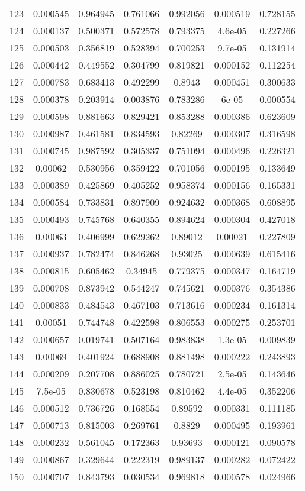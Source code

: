 \begin{table}
\begin{tabular}{c|c|c|c|c|c|c}
123 & 0.000545 & 0.964945 & 0.761066 & 0.992056 & 0.000519 & 0.728155\\
124 & 0.000137 & 0.500371 & 0.572578 & 0.793375 & 4.6e-05 & 0.227266\\
125 & 0.000503 & 0.356819 & 0.528394 & 0.700253 & 9.7e-05 & 0.131914\\
126 & 0.000442 & 0.449552 & 0.304799 & 0.819821 & 0.000152 & 0.112254\\
127 & 0.000783 & 0.683413 & 0.492299 & 0.8943 & 0.000451 & 0.300633\\
128 & 0.000378 & 0.203914 & 0.003876 & 0.783286 & 6e-05 & 0.000554\\
129 & 0.000598 & 0.881663 & 0.829421 & 0.853288 & 0.000386 & 0.623609\\
130 & 0.000987 & 0.461581 & 0.834593 & 0.82269 & 0.000307 & 0.316598\\
131 & 0.000745 & 0.987592 & 0.305337 & 0.751094 & 0.000496 & 0.226321\\
132 & 0.00062 & 0.530956 & 0.359422 & 0.701056 & 0.000195 & 0.133649\\
133 & 0.000389 & 0.425869 & 0.405252 & 0.958374 & 0.000156 & 0.165331\\
134 & 0.000584 & 0.733831 & 0.897909 & 0.924632 & 0.000368 & 0.608895\\
135 & 0.000493 & 0.745768 & 0.640355 & 0.894624 & 0.000304 & 0.427018\\
136 & 0.00063 & 0.406999 & 0.629262 & 0.89012 & 0.00021 & 0.227809\\
137 & 0.000937 & 0.782474 & 0.846268 & 0.93025 & 0.000639 & 0.615416\\
138 & 0.000815 & 0.605462 & 0.34945 & 0.779375 & 0.000347 & 0.164719\\
139 & 0.000708 & 0.873942 & 0.544247 & 0.745621 & 0.000376 & 0.354386\\
140 & 0.000833 & 0.484543 & 0.467103 & 0.713616 & 0.000234 & 0.161314\\
141 & 0.00051 & 0.744748 & 0.422598 & 0.806553 & 0.000275 & 0.253701\\
142 & 0.000657 & 0.019741 & 0.507164 & 0.983838 & 1.3e-05 & 0.009839\\
143 & 0.00069 & 0.401924 & 0.688908 & 0.881498 & 0.000222 & 0.243893\\
144 & 0.000209 & 0.207708 & 0.886025 & 0.780721 & 2.5e-05 & 0.143646\\
145 & 7.5e-05 & 0.830678 & 0.523198 & 0.810462 & 4.4e-05 & 0.352206\\
146 & 0.000512 & 0.736726 & 0.168554 & 0.89592 & 0.000331 & 0.111185\\
147 & 0.000713 & 0.815003 & 0.269761 & 0.8829 & 0.000495 & 0.193961\\
148 & 0.000232 & 0.561045 & 0.172363 & 0.93693 & 0.000121 & 0.090578\\
149 & 0.000867 & 0.329644 & 0.222319 & 0.989137 & 0.000282 & 0.072422\\
150 & 0.000707 & 0.843793 & 0.030534 & 0.969818 & 0.000578 & 0.024966\\
\end{tabular}
\end{table}
